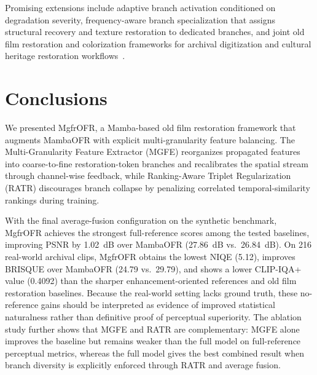 Promising extensions include adaptive branch activation conditioned on degradation severity, frequency-aware branch specialization that assigns structural recovery and texture restoration to dedicated branches, and joint old film restoration and colorization frameworks for archival digitization and cultural heritage restoration workflows~\cite{kokaram2004missing}.
\section{Conclusions}
\label{sec:conclusion}

We presented MgfrOFR, a Mamba-based old film restoration framework that augments MambaOFR with explicit multi-granularity feature balancing. The Multi-Granularity Feature Extractor (MGFE) reorganizes propagated features into coarse-to-fine restoration-token branches and recalibrates the spatial stream through channel-wise feedback, while Ranking-Aware Triplet Regularization (RATR) discourages branch collapse by penalizing correlated temporal-similarity rankings during training.

With the final average-fusion configuration on the synthetic benchmark, MgfrOFR achieves the strongest full-reference scores among the tested baselines, improving PSNR by 1.02~dB over MambaOFR (27.86~dB vs.\ 26.84~dB). On 216 real-world archival clips, MgfrOFR obtains the lowest NIQE (5.12), improves BRISQUE over MambaOFR (24.79 vs.\ 29.79), and shows a lower CLIP-IQA+ value (0.4092) than the sharper enhancement-oriented references and old film restoration baselines. Because the real-world setting lacks ground truth, these no-reference gains should be interpreted as evidence of improved statistical naturalness rather than definitive proof of perceptual superiority. The ablation study further shows that MGFE and RATR are complementary: MGFE alone improves the baseline but remains weaker than the full model on full-reference perceptual metrics, whereas the full model gives the best combined result when branch diversity is explicitly enforced through RATR and average fusion.

